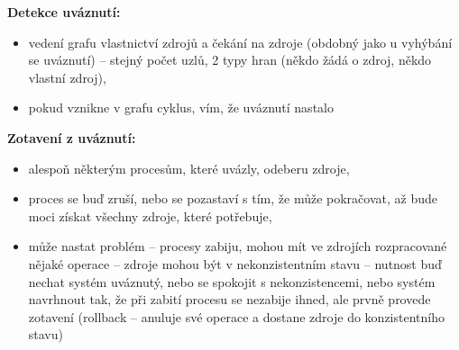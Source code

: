 \documentclass[a4paper, 11pt]{article}
\begin{document}
\textbf{Detekce uváznutí:}
\begin{itemize}
    \item vedení grafu vlastnictví zdrojů a čekání na zdroje (obdobný jako u vyhýbání se uváznutí) -- stejný počet uzlů, 2 typy hran (někdo žádá o zdroj, někdo vlastní zdroj),
    \item pokud vznikne v grafu cyklus, vím, že uváznutí nastalo
\end{itemize}
 
\textbf{Zotavení z uváznutí:}
\begin{itemize}
    \item alespoň některým procesům, které uvázly, odeberu zdroje,
    \item proces se buď zruší, nebo se pozastaví s tím, že může pokračovat, až bude moci získat všechny zdroje, které potřebuje,
    \item může nastat problém -- procesy zabiju, mohou mít ve zdrojích rozpracované nějaké operace -- zdroje mohou být v nekonzistentním stavu -- nutnost buď nechat systém uváznutý, nebo se spokojit s nekonzistencemi, nebo systém navrhnout tak, že při zabití procesu se nezabije ihned, ale prvně provede zotavení (rollback -- anuluje své operace a dostane zdroje do konzistentního stavu)
\end{itemize}
\end{document}
